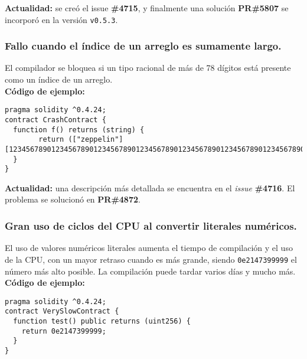 \textbf{Actualidad:} se creó el issue \textbf{\#4715}\cite{GHI4715}, y finalmente una solución \textbf{PR\#5807}\cite{GHPR5807} se incorporó en la versión \texttt{v0.5.3}.\\

\subsubsection{Fallo cuando el índice de un arreglo es sumamente largo.}

El compilador se bloquea si un tipo racional de más de 78 dígitos está presente como un índice de un arreglo.\\

\textbf{Código de ejemplo:}
\begin{lstlisting}[language=Solidity]
pragma solidity ^0.4.24;
contract CrashContract {
  function f() returns (string) {
        return (["zeppelin"][123456789012345678901234567890123456789012345678901234567890123456789012345678]);
  }
}
\end{lstlisting}

\textbf{Actualidad:} una descripción más detallada se encuentra en el \textit{issue} \textbf{\#4716}\cite{GHI4716}. El problema se solucionó en \textbf{PR\#4872}\cite{GHPR4872}.\\

\subsubsection{Gran uso de ciclos del CPU al convertir literales numéricos.}

El uso de valores numéricos literales aumenta el tiempo de compilación y el uso de la CPU, con un mayor retraso cuando es más grande, siendo \texttt{0e2147399999} el número más alto posible. La compilación puede tardar varios días y mucho más.\\

\textbf{Código de ejemplo:}
\begin{lstlisting}[language=Solidity]
pragma solidity ^0.4.24;                                                  
contract VerySlowContract {                                                                                                                                
  function test() public returns (uint256) {                                                                                                   
    return 0e2147399999;                                                                                                                       
  }                                                                                                                                            
}
\end{lstlisting}


